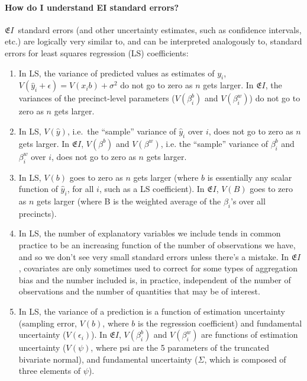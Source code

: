 \documentclass[11pt,titlepage]{article}
\newcommand{\EI}{\ensuremath{{\mathfrak EI}}}
\begin{document}
\paragraph{How do I understand EI standard errors?}
\EI\ standard errors (and other uncertainty estimates, such as
confidence intervals, etc.) are logically very similar to, and can be
interpreted analogously to, standard errors for least squares
regression (LS) coefficients:
\begin{enumerate}
\item In LS, the variance of predicted values as estimates of $y_i$,
  $V(\hat y_i+\epsilon)=V(x_ib)+\sigma^2$ do not go to zero as $n$
  gets larger.  In \EI, the variances of the precinct-level parameters
  ($V(\beta^b_i)$ and $V(\beta^w_i)$) do not go to zero as $n$ gets
  larger.

\item In LS, $V(\hat y)$, i.e.\ the ``sample'' variance of $\hat y_i$
  over $i$, does not go to zero as $n$ gets larger.  In \EI,
  $V(\beta^b)$ and $V(\beta^w)$, i.e. the ``sample'' variance of
  $\beta^b_i$ and $\beta^w_i$ over $i$, does not go to zero as $n$
  gets larger.

\item In LS, $V(b)$ goes to zero as $n$ gets larger (where $b$ is
  essentially any scalar function of $\hat y_i$, for all $i$, such as
  a LS coefficient).  In \EI, $V(B)$ goes to zero as $n$ gets
  larger (where B is the weighted average of the $\beta_i$'s over all
  precincts).

\item In LS, the number of explanatory variables we include tends in
  common practice to be an increasing function of the number of
  observations we have, and so we don't see very small standard errors
  unless there's a mistake.  In \EI, covariates are only sometimes
  used to correct for some types of aggregation bias and the number
  included is, in practice, independent of the number of observations
  and the number of quantities that may be of interest.

\item In LS, the variance of a prediction is a function of estimation
  uncertainty (sampling error, $V(b)$, where $b$ is the regression
  coefficient) and fundamental uncertainty ($V(\epsilon_i)$).  In \EI,
  $V(\beta^b_i)$ and $V(\beta^w_i)$ are functions of estimation
  uncertainty ($V(\psi)$, where psi are the 5 parameters of the
  truncated bivariate normal), and fundamental uncertainty ($\Sigma$,
  which is composed of three elements of $\psi$).


\end{enumerate}
\end{document}
